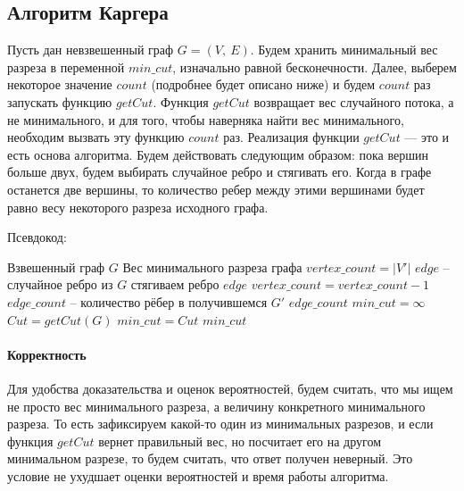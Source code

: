 \documentclass[a4paper,12pt]{article}
\begin{document}
\subsection{Алгоритм Каргера}

Пусть дан невзвешенный граф $G = (V,\ E)$. Будем хранить минимальный вес разреза в переменной $min\_cut$, изначально равной бесконечности. Далее, выберем некоторое значение $count$ (подробнее будет описано ниже) и будем $count$ раз запускать функцию $getCut$.
Функция $getCut$ возвращает вес случайного потока, а не минимального, и для того, чтобы наверняка найти вес минимального, необходим вызвать эту функцию $count$ раз. Реализация функции $getCut$ — это и есть основа алгоритма. Будем действовать следующим образом: пока вершин больше двух, будем выбирать случайное ребро и стягивать его. Когда в графе останется две вершины, то количество ребер между этими вершинами будет равно весу некоторого разреза исходного графа. 

Псевдокод:

\begin{algorithm}[H]
  	\caption{($G = (V,\ E),\ count$)}
	\begin{algorithmic}[1]
        \Require Взвешенный граф $G$
        \Ensure Вес минимального разреза графа
        \State 
            \State $vertex\_count = |V'|$
                \State $edge$ -- случайное ребро из $G$
                \State стягиваем ребро $edge$
                \State $vertex\_count = vertex\_count - 1$
            \EndWhile
            \State $edge\_count$ -- количество рёбер в получившемся $G'$
            \State \Return $edge\_count$
        \EndFunction
        \State 
        \State 
        \State $min\_cut = \infty$
            \State $Cut = getCut(G)$
                \State $min\_cut = Cut$
            \EndIf
        \EndFor
        \State \Return $min\_cut$
	\end{algorithmic}
\end{algorithm}

\paragraph{Корректность}

 Для удобства доказательства и оценок вероятностей, будем считать, что мы ищем не просто вес минимального разреза, а величину конкретного минимального разреза. То есть зафиксируем какой-то один из минимальных разрезов, и если функция $getCut$ вернет правильный вес, но посчитает его на другом минимальном разрезе, то будем считать, что ответ получен неверный. Это условие не ухудшает оценки вероятностей и время работы алгоритма.
 
\end{document}
